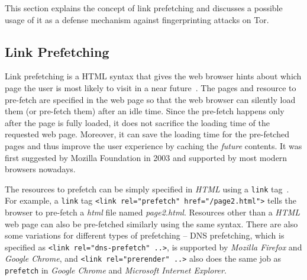 
This section explains the concept of link prefetching and discusses a possible usage of it as a defense mechanism against fingerprinting attacks on Tor.

\subsection{Link Prefetching}

Link prefetching is a HTML syntax that gives the web browser hints about which page the user is most likely to visit in a near future~\cite{fisher2003, fisher2004link}. 
The pages and resource to pre-fetch are specified in the web page so that the web browser can silently load them (or pre-fetch them) after an idle time.
Since the pre-fetch happens only after the page is fully loaded, it does not sacrifice the loading time of the requested web page.
Moreover, it can save the loading time for the pre-fetched pages and thus improve the user experience by caching the {\it future} contents.
It was first suggested by Mozilla Foundation in 2003 and supported by most modern browsers nowadays.

The resources to prefetch can be simply specified in {\it HTML} using a {\tt link} tag~\cite{nottingham2010}.
For example, a {\tt link} tag {\tt <link rel="p\-refetch" href="/page2.html">} tells the browser to pre-fetch a {\it html} file named {\it page2.html}.
Resources other than a {\it HTML} web page can also be pre-fetched similarly using the same syntax.
There are also some variations for different types of prefetching -- DNS prefetching, which is specified as {\tt <link rel="dns-prefetch" ..>}, is supported by {\it Mozilla Firefox} and {\it Google Chrome}, and {\tt <link rel="prerender" ..>} also does the same job as {\tt prefetch} in {\it Google Chrome} and {\it Microsoft Internet Explorer}.

